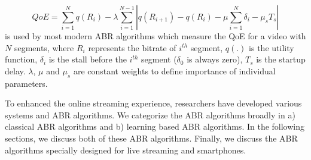 \begin{equation}
\label{eqn:QoE}
QoE = \sum_{i=1}^N q(R_i) - \lambda\sum_{i=1}^{N-1}\left|q(R_{i+1})-q(R_i) - \mu\sum_{i=1}^N \delta_i - \mu_s T_s\right|
\end{equation}
\eqn{\ref{eqn:QoE}} is used by most modern ABR algorithms which measure the QoE for a video with $N$ segments, where $R_i$ represents the bitrate of $i^{th}$ segment, $q(.)$ is the utility function, $\delta_i$ is the stall before the $i^{th}$ segment ($\delta_0$ is always zero), $T_s$ is the startup delay. $\lambda$, $\mu$ and $\mu_s$ are constant weights to define importance of individual parameters.

To enhanced the online streaming experience, researchers have developed various systems and ABR algorithms. We categorize the ABR algorithms broadly in a) classical ABR algorithms and b) learning based ABR algorithms. In the following sections, we discuss both of these ABR algorithms. Finally, we discuss the ABR algorithms specially designed for live streaming and smartphones.

